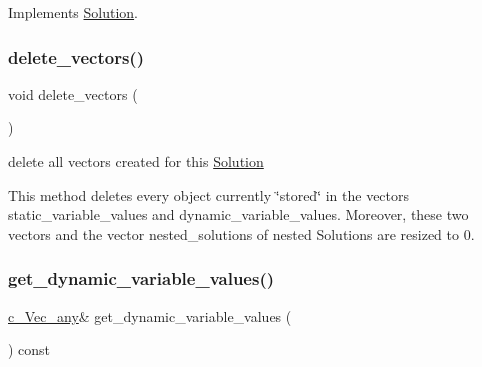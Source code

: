 Implements \mbox{\hyperlink{class_s_m_spp__di__unipi__it_1_1_solution_a02ecf9046100701d7bcc800deaa5717b}{Solution}}.

\mbox{\label{class_s_m_spp__di__unipi__it_1_1_col_variable_solution_adf3fbe12e764eb353caf53d81cee4cf6}} 
\subsubsection{\texorpdfstring{delete\+\_\+vectors()}{delete\_vectors()}}
{\footnotesize\ttfamily void delete\+\_\+vectors (\begin{DoxyParamCaption}{ }\end{DoxyParamCaption})\hspace{0.3cm}{\ttfamily [protected]}}



delete all vectors created for this \mbox{\hyperlink{class_s_m_spp__di__unipi__it_1_1_solution}{Solution}} 

This method deletes every object currently \char`\"{}stored\char`\"{} in the vectors static\+\_\+variable\+\_\+values and dynamic\+\_\+variable\+\_\+values. Moreover, these two vectors and the vector nested\+\_\+solutions of nested Solutions are resized to 0. \mbox{\label{class_s_m_spp__di__unipi__it_1_1_col_variable_solution_a6373359b6454ca1880b8494dd1cd0164}} 
\subsubsection{\texorpdfstring{get\+\_\+dynamic\+\_\+variable\+\_\+values()}{get\_dynamic\_variable\_values()}}
{\footnotesize\ttfamily \mbox{\hyperlink{group___s_m_s__types_gaa16aeddc7a50d64299ee0f8d9ca5dc7d}{c\+\_\+\+Vec\+\_\+any}}\& get\+\_\+dynamic\+\_\+variable\+\_\+values (\begin{DoxyParamCaption}\item[{void}]{ }\end{DoxyParamCaption}) const\hspace{0.3cm}{\ttfamily [inline]}}



